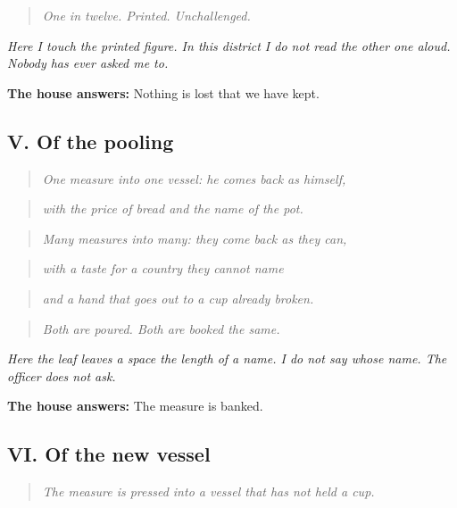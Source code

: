 \documentclass{design/chronicle}
\begin{document}
\begin{quote}\itshape One in twelve. Printed. Unchallenged.\end{quote}

\emph{Here I touch the printed figure. In this district I do not read the other one aloud. Nobody has ever asked me to.}

\textbf{The house answers:} Nothing is lost that we have kept.

\subsection*{V. Of the pooling}

\begin{quote}\itshape One measure into one vessel: he comes back as himself,\end{quote}

\begin{quote}\itshape with the price of bread and the name of the pot.\end{quote}

\begin{quote}\itshape Many measures into many: they come back as they can,\end{quote}

\begin{quote}\itshape with a taste for a country they cannot name\end{quote}

\begin{quote}\itshape and a hand that goes out to a cup already broken.\end{quote}

\begin{quote}\itshape Both are poured. Both are booked the same.\end{quote}

\emph{Here the leaf leaves a space the length of a name. I do not say whose name. The officer does not ask.}

\textbf{The house answers:} The measure is banked.

\subsection*{VI. Of the new vessel}

\begin{quote}\itshape The measure is pressed into a vessel that has not held a cup.\end{quote}
\end{document}
